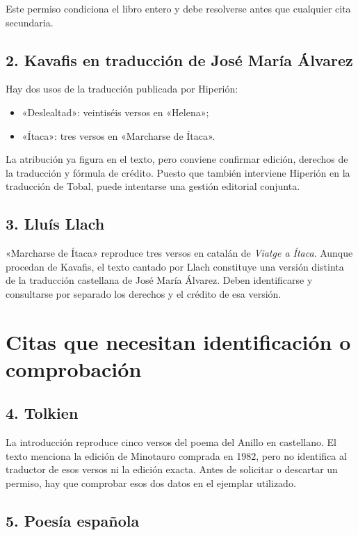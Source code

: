 \documentclass[12pt,a4paper]{article}
\begin{document}
Este permiso condiciona el libro entero y debe resolverse antes que cualquier cita secundaria.

\subsection*{2. Kavafis en traducción de José María Álvarez}

Hay dos usos de la traducción publicada por Hiperión:

\begin{itemize}[leftmargin=*]
  \item «Deslealtad»: veintiséis versos en «Helena»;
  \item «Ítaca»: tres versos en «Marcharse de Ítaca».
\end{itemize}

La atribución ya figura en el texto, pero conviene confirmar edición, derechos de la traducción y fórmula de crédito. Puesto que también interviene Hiperión en la traducción de Tobal, puede intentarse una gestión editorial conjunta.

\subsection*{3. Lluís Llach}

«Marcharse de Ítaca» reproduce tres versos en catalán de \emph{Viatge a Ítaca}. Aunque procedan de Kavafis, el texto cantado por Llach constituye una versión distinta de la traducción castellana de José María Álvarez. Deben identificarse y consultarse por separado los derechos y el crédito de esa versión.

\section*{Citas que necesitan identificación o comprobación}

\subsection*{4. Tolkien}

La introducción reproduce cinco versos del poema del Anillo en castellano. El texto menciona la edición de Minotauro comprada en 1982, pero no identifica al traductor de esos versos ni la edición exacta. Antes de solicitar o descartar un permiso, hay que comprobar esos dos datos en el ejemplar utilizado.

\subsection*{5. Poesía española}
\end{document}
